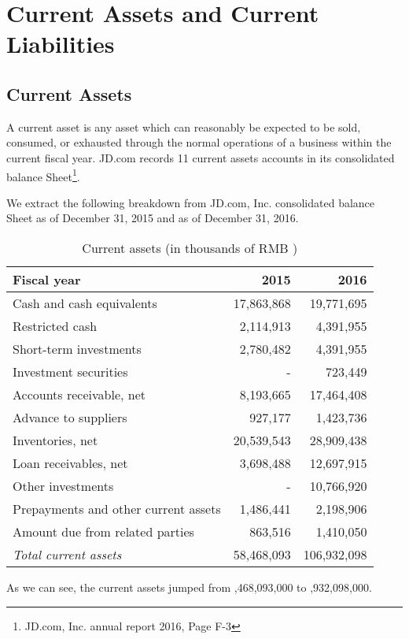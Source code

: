 \chapter{Current Assets and Current Liabilities}
\section{Current Assets}
A current asset is any asset which can reasonably be expected to be sold, consumed, or exhausted through the normal operations of a business within the current fiscal year. JD.com records 11 current assets accounts in its consolidated balance Sheet\footnote{JD.com, Inc. annual report 2016, Page F-3}. 

We extract the following breakdown from JD.com, Inc. consolidated balance Sheet as of December 31, 2015 and as of December 31, 2016.\\

\begin{table}[H]	
\begin{center}
	\begin{tabular}{lrr}
		\toprule
		\textbf{Fiscal year}&\textbf{2015}&\textbf{2016}\\
		\midrule
		Cash and cash equivalents&17,863,868&19,771,695\\
		Restricted cash&2,114,913&4,391,955\\
		Short-term investments&2,780,482&4,391,955\\
		Investment securities&-&723,449\\
		Accounts receivable, net&8,193,665&17,464,408\\
		Advance to suppliers&927,177&1,423,736\\
		Inventories, net&20,539,543&28,909,438\\
		Loan receivables, net&3,698,488&12,697,915\\
		Other investments&-&10,766,920\\
		Prepayments and other current assets&1,486,441&2,198,906\\
		Amount due from related parties&863,516&1,410,050\\
		\qquad\emph{Total current assets}&58,468,093&106,932,098\\
		\bottomrule
	\end{tabular}
\end{center}
	\caption{Current assets (in thousands of RMB \textyen)}\label{table:1}
\end{table}
As we can see, the current assets jumped from ,468,093,000 to ,932,098,000.

